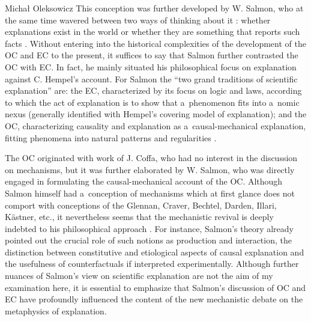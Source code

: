 \begin{artengenv}{Michał Oleksowicz}
This conception was further developed by W. Salmon, who at the same time wavered between two ways of thinking about it
\parencite[][p.262]{bokulich_fiction_2016}: %
 whether explanations exist in the world or whether they are something that reports such facts 
\parencite[][p.86]{salmon_four_1989}. %
 Without entering into the historical complexities of the development of the OC and EC to the present, it suffices to say that Salmon further contrasted the OC with EC. In fact, he mainly situated his philosophical focus on explanation against C. Hempel's account. For Salmon the ``two grand traditions of scientific explanation'' 
\parencite[][pp.68–69]{salmon_four_1989} %
 are: the EC, characterized by its focus on logic and laws, according to which the act of explanation is to show that a~phenomenon fits into a~nomic nexus (generally identified with Hempel's covering model of explanation); and the OC, characterizing causality and explanation as a~causal-mechanical explanation, fitting phenomena into natural patterns and regularities 
\parencites[][pp.84–134]{salmon_scientific_1984}[][pp.320–330]{salmon_four_1989}{wright_ontic_2018}.%


The OC originated with work of J. Coffa, who had no interest in the discussion on mechanisms, but it was further elaborated by W. Salmon, who was directly engaged in formulating the causal-mechanical account of the OC. Although Salmon himself had a~conception of mechanisms which at first glance does not comport with conceptions of the Glennan, Craver, Bechtel, Darden, Illari, Kästner, etc., it nevertheless seems that the mechanistic revival is deeply indebted to his philosophical approach
\parencite[][]{campaner_mechanistic_2013}. %
 For instance, Salmon's theory already pointed out the crucial role of such notions as production and interaction, the distinction between constitutive and etiological aspects of causal explanation and the usefulness of counterfactuals if interpreted experimentally. Although further nuances of Salmon's view on scientific explanation are not the aim of my examination here, it is essential to emphasize that Salmon's discussion of OC and EC have profoundly influenced the content of the new mechanistic debate on the metaphysics of explanation.


\end{artengenv}

